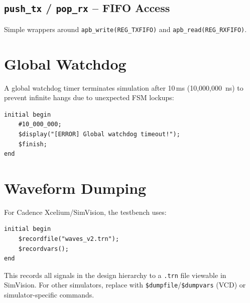 \subsection{\texttt{push\_tx} / \texttt{pop\_rx} -- FIFO Access}

Simple wrappers around \texttt{apb\_write(REG\_TXFIFO)} and \texttt{apb\_read(REG\_RXFIFO)}.

\section{Global Watchdog}

A global watchdog timer terminates simulation after 10\,ms (10,000,000~ns) to prevent infinite
hangs due to unexpected FSM lockups:
\begin{lstlisting}
initial begin
    #10_000_000;
    $display("[ERROR] Global watchdog timeout!");
    $finish;
end
\end{lstlisting}

\section{Waveform Dumping}

For Cadence Xcelium/SimVision, the testbench uses:
\begin{lstlisting}
initial begin
    $recordfile("waves_v2.trn");
    $recordvars();
end
\end{lstlisting}

This records all signals in the design hierarchy to a \texttt{.trn} file viewable in SimVision.
For other simulators, replace with \texttt{\$dumpfile}/\texttt{\$dumpvars} (VCD) or simulator-specific
commands.
